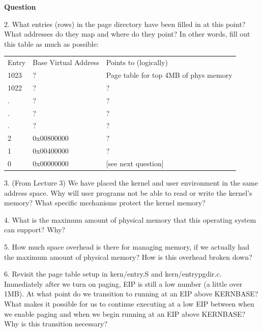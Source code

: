 \documentclass[11pt]{article}
\begin{document}
\begin{framed}
\textbf{Question}

2. What entries (rows) in the page directory have been filled in at this point? What addresses do they map and where do they point? In other words, fill out this table as much as possible:

\begin{tabular}{lll}
Entry & Base Virtual Address & Points to (logically)\\
1023	  & ?	& Page table for top 4MB of phys memory\\
1022	  & ?	& ?\\
.	  & ?	& ?\\
.	  & ?	& ?\\
.	  & ?	& ?\\
2	  & 0x00800000	& ?\\
1	  & 0x00400000	& ?\\
0	  & 0x00000000	& [see next question]\\
\end{tabular}

3. (From Lecture 3) We have placed the kernel and user environment in the same address space. Why will user programs not be able to read or write the kernel's memory? What specific mechanisms protect the kernel memory?

4. What is the maximum amount of physical memory that this operating system can support? Why?

5. How much space overhead is there for managing memory, if we actually had the maximum amount of physical memory? How is this overhead broken down?

6. Revisit the page table setup in kern/entry.S and kern/entrypgdir.c. Immediately after we turn on paging, EIP is still a low number (a little over 1MB). At what point do we transition to running at an EIP above KERNBASE? What makes it possible for us to continue executing at a low EIP between when we enable paging and when we begin running at an EIP above KERNBASE? Why is this transition necessary? 
\end{framed}
\end{document}
